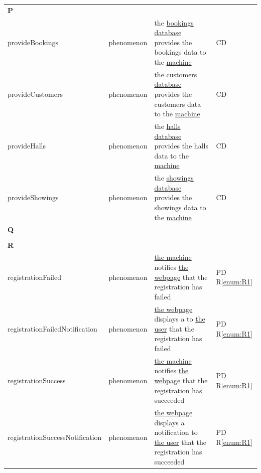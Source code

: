 \documentclass[a4paper,10pt,titlepage,bibtotoc,bibtotocnumbered]{scrreprt}
\begin{document}
\begin{longtable}{|l|p{3cm}|p{5cm}|l|}
\hline
&  &  & \\
\hline
\multicolumn{4}{|l|}{\textbf{P}}\\
\hline
\hypertarget{glossary:provideBookings}{provideBookings} & phenomenon & the \hyperlink{glossary:BookingsDatabase}{bookings database} provides the bookings data to the \hyperlink{glossary:UDEKino}{machine} & CD\\
\hline
\hypertarget{glossary:provideCustomers}{provideCustomers} & phenomenon & the \hyperlink{glossary:CustomersDatabase}{customers database} provides the customers data to the \hyperlink{glossary:UDEKino}{machine} & CD\\
\hline
\hypertarget{glossary:provideHalls}{provideHalls} & phenomenon & the \hyperlink{glossary:HallsDatabase}{halls database} provides the halls data to the \hyperlink{glossary:UDEKino}{machine} & CD\\
\hline
\hypertarget{glossary:provideShowings}{provideShowings} & phenomenon & the \hyperlink{glossary:ShowingsDatabase}{showings database} provides the showings data to the \hyperlink{glossary:UDEKino}{machine} & CD\\
\hline
\multicolumn{4}{|l|}{\textbf{Q}}\\
\hline
&  &  & \\
\hline
\multicolumn{4}{|l|}{\textbf{R}}\\
\hline
\hypertarget{glossary:registrationFailed}{registrationFailed} & phenomenon & \hyperlink{glossary:UDEKino}{the machine} notifies \hyperlink{glossary:WebpageRegisterCustomer}{the webpage} that the registration has failed & PD R\ref{enum:R1}\\
\hline
\hypertarget{glossary:registrationFailedNotification}{registrationFailedNotification} & phenomenon & \hyperlink{glossary:WebpageRegisterCustomer}{the webpage} displays a to \hyperlink{glossary:User}{the user} that the registration has failed & PD R\ref{enum:R1}\\
\hline
\hypertarget{glossary:registrationSuccess}{registrationSuccess} & phenomenon & \hyperlink{glossary:UDEKino}{the machine} notifies \hyperlink{glossary:WebpageRegisterCustomer}{the webpage} that the registration has succeeded & PD R\ref{enum:R1}\\
\hline
\hypertarget{glossary:registrationSuccessNotification}{registrationSuccessNotification} & phenomenon & \hyperlink{glossary:WebpageRegisterCustomer}{the webpage} displays a notification to \hyperlink{glossary:User}{the user} that the registration has succeeded & PD R\ref{enum:R1}\\

\end{longtable}
\end{document}
